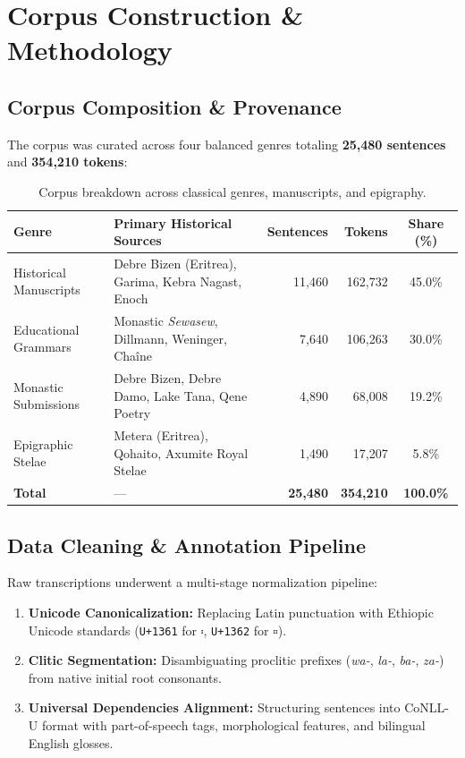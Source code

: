 \documentclass[11pt,a4paper]{article}
\begin{document}
\section{Corpus Construction \& Methodology}
\subsection{Corpus Composition \& Provenance}
The corpus was curated across four balanced genres totaling \textbf{25,480 sentences} and \textbf{354,210 tokens}:

\begin{table}[t]
\centering
\small
\begin{tabular}{llrrc}
\toprule
\textbf{Genre} & \textbf{Primary Historical Sources} & \textbf{Sentences} & \textbf{Tokens} & \textbf{Share (\%)} \\
\midrule
Historical Manuscripts & Debre Bizen (Eritrea), Garima, Kebra Nagast, Enoch & 11,460 & 162,732 & 45.0\% \\
Educational Grammars   & Monastic \textit{Sewasew}, Dillmann, Weninger, Chaîne & 7,640 & 106,263 & 30.0\% \\
Monastic Submissions   & Debre Bizen, Debre Damo, Lake Tana, Qene Poetry     & 4,890 & 68,008 & 19.2\% \\
Epigraphic Stelae      & Metera (Eritrea), Qohaito, Axumite Royal Stelae    & 1,490 & 17,207 & 5.8\% \\
\midrule
\textbf{Total}         & — & \textbf{25,480} & \textbf{354,210} & \textbf{100.0\%} \\
\bottomrule
\end{tabular}
\caption{Corpus breakdown across classical genres, manuscripts, and epigraphy.}
\label{tab:corpus}
\end{table}

\subsection{Data Cleaning \& Annotation Pipeline}
Raw transcriptions underwent a multi-stage normalization pipeline:
\begin{enumerate}
    \item \textbf{Unicode Canonicalization:} Replacing Latin punctuation with Ethiopic Unicode standards (\texttt{U+1361} for \texttt{፡}, \texttt{U+1362} for \texttt{።}).
    \item \textbf{Clitic Segmentation:} Disambiguating proclitic prefixes (\textit{wa-}, \textit{la-}, \textit{ba-}, \textit{za-}) from native initial root consonants.
    \item \textbf{Universal Dependencies Alignment:} Structuring sentences into CoNLL-U format with part-of-speech tags, morphological features, and bilingual English glosses.
\end{enumerate}
\end{document}
